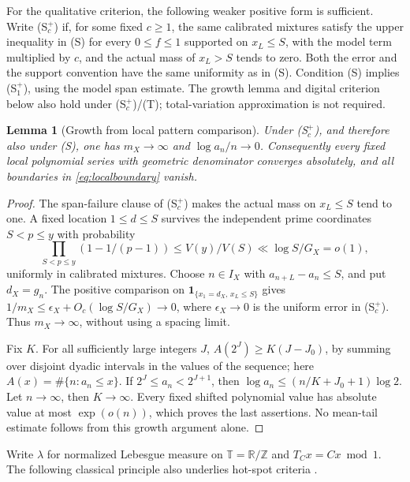 \documentclass[11pt,a4paper]{article}
\newtheorem{lemma}[theorem]{Lemma}
\newcommand{\Z}{\mathbb Z}
\newcommand{\R}{\mathbb R}
\newcommand{\ind}{\mathbf 1}
\begin{document}
For the qualitative criterion, the following weaker positive form is
sufficient. Write (S$^+_c$) if, for some fixed $c\ge1$, the same
calibrated mixtures satisfy the upper inequality in (S) for every
$0\le f\le1$ supported on $x_L\le S$, with the model term multiplied
by $c$, and the actual mass of $x_L>S$ tends to zero. Both the error
and the support convention have the same uniformity as in (S).
Condition (S) implies (S$^+_1$), using the model span estimate.
The growth lemma and digital criterion below also hold under
(S$^+_c$)/(T); total-variation approximation is not required.

\begin{lemma}[Growth from local pattern comparison]\label{lem:derivedgrowth}
Under (S$^+_c$), and therefore also under (S), one has
$m_X\to\infty$ and $\log a_n/n\to0$.
Consequently every fixed local polynomial series with geometric
denominator converges absolutely, and all boundaries in
\eqref{eq:localboundary} vanish.
\end{lemma}
\begin{proof}
The span-failure clause of (S$^+_c$) makes the actual mass on
$x_L\le S$ tend to one. A fixed location $1\le d\le S$ survives the independent
prime coordinates $S<p\le y$ with probability
\[
 \prod_{S<p\le y}(1-1/(p-1))
       \le V(y)/V(S)\ll\log S/G_X=o(1),
\]
uniformly in calibrated mixtures. Choose $n\in I_X$ with
$a_{n+L}-a_n\le S$, and put $d_X=g_n$.
The positive comparison on $\ind_{\{x_1=d_X,\,x_L\le S\}}$
gives $1/m_X\le\epsilon_X+O_c(\log S/G_X)\to0$, where
$\epsilon_X\to0$ is the uniform error in (S$^+_c$). Thus $m_X\to\infty$,
without using a spacing limit.

Fix $K$. For all sufficiently large integers $J$,
$A(2^J)\ge K(J-J_0)$, by summing over disjoint dyadic intervals in the values of the sequence;
here $A(x)=\#\{n:a_n\le x\}$.
If $2^J\le a_n<2^{J+1}$, then
$\log a_n\le(n/K+J_0+1)\log2$.
Let $n\to\infty$, then $K\to\infty$.
Every fixed shifted polynomial value has absolute value at most $\exp(o(n))$,
which proves the last assertions. No mean-tail estimate follows from
this growth argument alone.
\end{proof}

Write $\lambda$ for normalized Lebesgue measure on
$\mathbb T=\R/\Z$ and $T_Cx=Cx\bmod1$.
The following classical principle also underlies hot-spot criteria
\cite[Lemma 3.2]{baileymisiurewicz}.
\end{document}
